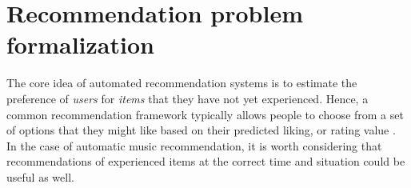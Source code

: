 




\section{Recommendation problem formalization}\label{sec:4-recommendation-problem-formalization}
The core idea of automated recommendation systems is to estimate the preference of \emph{users} for \emph{items} that they have not yet experienced. 
Hence, a common recommendation framework typically allows people to choose from a set of options that they might like based on their predicted liking, or {rating} value \autocite{adomavicius05toward}. In the case of automatic music recommendation, it is worth considering that recommendations of experienced items at the correct time and situation could be useful as well.

